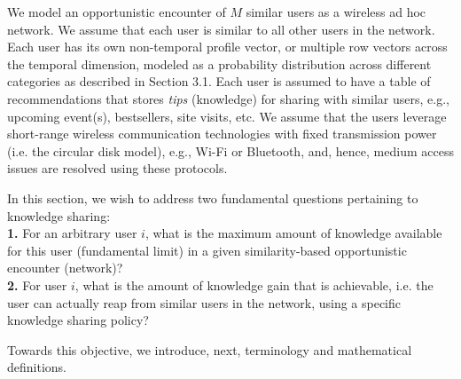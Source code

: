 \documentclass[12pt,epsf]{article}
\theoremstyle{definition}
\begin{document}
We model an opportunistic encounter of $M$ similar users as a wireless ad hoc network. We assume that each user is similar to all other users in the network. Each user has its own non-temporal profile vector, or multiple row vectors across the temporal dimension, modeled as a probability distribution across different categories as described in Section 3.1. Each user is assumed to have a table of recommendations that stores {\it tips} (knowledge) for sharing with similar users, e.g., upcoming event(s), bestsellers, site visits, etc. We assume that the users leverage short-range wireless communication technologies with fixed transmission power (i.e. the circular disk model), e.g., Wi-Fi or Bluetooth, and, hence, medium access issues are resolved using these protocols.

In this section, we wish to address two fundamental questions pertaining to knowledge sharing:\\
{\bf 1.} For an arbitrary user $i$, what is the maximum amount of knowledge available for this user (fundamental limit) in a given similarity-based opportunistic encounter (network)?\\
{\bf 2.} For user $i$, what is the amount of knowledge gain that is achievable, i.e. the user can actually reap from similar users in the network, using a specific knowledge sharing policy?

Towards this objective, we introduce, next, terminology and mathematical definitions.


\end{document}
